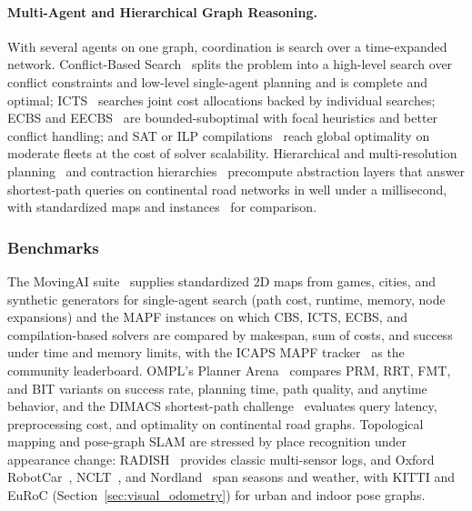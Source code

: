 \paragraph{Multi-Agent and Hierarchical Graph Reasoning.}
With several agents on one graph, coordination is search over a time-expanded network. Conflict-Based Search~\cite{Sharon2015CBS} splits the problem into a high-level search over conflict constraints and low-level single-agent planning and is complete and optimal; ICTS~\cite{Sharon2013ICTS} searches joint cost allocations backed by individual searches; ECBS and EECBS~\cite{Barer2014ECBS,Li2021EECBS} are bounded-suboptimal with focal heuristics and better conflict handling; and SAT or ILP compilations~\cite{Surynek2016SATMAPF,Yu2016OptimalMAPF} reach global optimality on moderate fleets at the cost of solver scalability. Hierarchical and multi-resolution planning~\cite{Botea2004HPA} and contraction hierarchies~\cite{Geisberger2008CH} precompute abstraction layers that answer shortest-path queries on continental road networks in well under a millisecond, with standardized maps and instances~\cite{Sturtevant2012Benchmarks,MovingAI2025} for comparison.

\subsubsection{Benchmarks}
The MovingAI suite~\cite{Sturtevant2012Benchmarks,MovingAI2025} supplies standardized 2D maps from games, cities, and synthetic generators for single-agent search (path cost, runtime, memory, node expansions) and the MAPF instances on which CBS, ICTS, ECBS, and compilation-based solvers are compared by makespan, sum of costs, and success under time and memory limits, with the ICAPS MAPF tracker~\cite{Stern2019MAPFsurvey} as the community leaderboard. OMPL's Planner Arena~\cite{OMPL2025} compares PRM, RRT, FMT, and BIT variants on success rate, planning time, path quality, and anytime behavior, and the DIMACS shortest-path challenge~\cite{DIMACS2025} evaluates query latency, preprocessing cost, and optimality on continental road graphs. Topological mapping and pose-graph SLAM are stressed by place recognition under appearance change: RADISH~\cite{radish2003} provides classic multi-sensor logs, and Oxford RobotCar~\cite{Maddern2017RobotCar}, NCLT~\cite{Carlevaris2016NCLT}, and Nordland~\cite{olid2018singleviewplace} span seasons and weather, with KITTI and EuRoC (Section~\ref{sec:visual_odometry}) for urban and indoor pose graphs.

